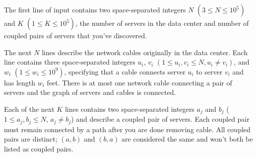 

The first line of input contains two space-separated integers $N$ $(3 \le N \le 10^5)$ and $K$ $(1 \le K \le 10^5)$, the number of servers in the data center and number of coupled pairs of servers that you've discovered.

The next $N$ lines describe the network cables originally in the data center. Each line contains three space-separated integers $u_i$, $v_i$ $(1 \le u_i, v_i \le N, u_i \ne v_i)$, and $w_i$ $(1 \le w_i \le 10^9)$, specifying that a cable connects server $u_i$ to server $v_i$ and has length $w_i$ feet. There is at most one network cable connecting a pair of servers and the graph of servers and cables is connected.

Each of the next $K$ lines contains two space-separated integers $a_j$ and $b_j$ ($1 \le a_j, b_j \le N$, $a_j \ne b_j$) and describe a coupled pair of servers. Each coupled pair must remain connected by a path after you are done removing cable. All coupled pairs are distinct; $(a,b)$ and $(b,a)$ are considered the same and won't both be listed as coupled pairs.

